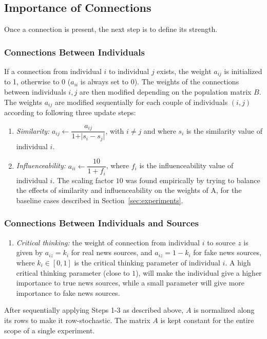 \subsection{Importance of Connections}
Once a connection is present, the next step is to define its strength.

\subsubsection{Connections Between Individuals}
If a connection from individual $i$ to individual $j$ exists, the weight $a_{ij}$ is initialized to 1, otherwise to 0 ($a_{ii}$ is always set to 0).
The weights of the connections between individuals $i,j$ are then modified depending on the population matrix $B$. The weights $a_{ij}$ are modified sequentially for each couple of individuals $(i,j)$ according to following three update steps:

\begin{enumerate}
\item[\text{(S1)}] \textit{Similarity:} $a_{ij} \leftarrow \dfrac{a_{ij}}{1 + \vert s_i - s_j\vert}$, with $ i \neq j$ and where $s_i$ is the similarity value of individual $i$. 
\item[\text{(S2)}] \textit{Influenceability:} $a_{ii} \leftarrow \dfrac{10}{1 + f_i}$, where $f_i$ is the influenceability value of individual $i$. The scaling factor $10$ was found empirically by trying to balance the effects of similarity and influenceability on the weights of A, for the baseline cases described in Section~\ref{sec:experiments}.
\end{enumerate}


\subsubsection{Connections Between Individuals and Sources}
\label{subsub:ind_sources}
\begin{enumerate}
\item[\text{(S3)}] \textit{Critical thinking:} the weight of connection from individual $i$ to source $z$ is given by $a_{iz} = k_i$ for real news sources, and $a_{iz} = 1 - k_i$ for fake news sources, where $k_i \in [0,1]$ is the critical thinking parameter of individual $i$. A high critical thinking parameter (close to $1$), will make the individual give a higher importance to true news sources, while a small parameter will give more importance to fake news sources.
\end{enumerate}
After sequentially applying Steps 1-3 as described above, $A$ is normalized along its rows to make it row-stochastic. The matrix $A$ is kept constant for the entire scope of a single experiment.